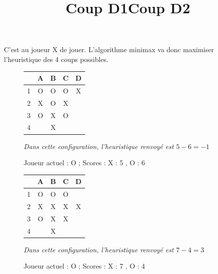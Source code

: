 \documentclass{report}
\begin{document}
C'est au joueur X de jouer. L'algorithme minimax va donc maximiser l'heuristique des 4 coups possibles.

\begin{figure}[!h]
\begin{center}
\renewcommand{\arraystretch} {1.5}
    \begin{tabular}{c|c|c|c|c|}
          &A & B & C & D \\
        \hline
        1 & O & O & O & X\\
        \hline
        2 & X & O & X &  \\
        \hline
        3 & O & X & O &  \\
        \hline
        4 &  & X &  &  \\
        \hline
    \end{tabular}

\end{center}
\begin{center}
    \title{Coup D1}
    \label{Figure 1}
    \caption{Joueur actuel : O ; Scores : X : 5 , O : 6}
    \textit{Dans cette configuration, l'heuristique renvoyé est $5-6=-1$}
\end{center}
\end{figure}

\begin{figure}[!h]
\begin{center}
\renewcommand{\arraystretch} {1.5}
    \begin{tabular}{c|c|c|c|c|}
          &A & B & C & D \\
        \hline
        1 & O & O & O & \\
        \hline
        2 & X & X & X & X \\
        \hline
        3 & O & X & X &  \\
        \hline
        4 &  & X &  &  \\
        \hline
    \end{tabular}

\end{center}
\begin{center}
    \title{Coup D2}
    \label{Figure 1}
    \caption{Joueur actuel : O ; Scores : X : 7 , O : 4}
    \textit{Dans cette configuration, l'heuristique renvoyé est $7-4=3$}
\end{center}
\end{figure}
\end{document}
